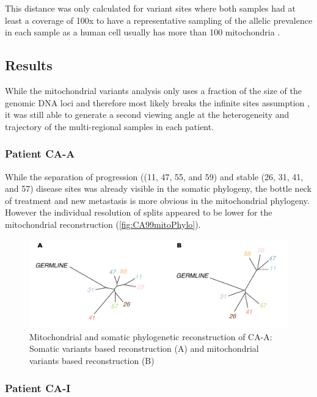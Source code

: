 This distance was only calculated for variant sites where both samples had at least a coverage of 100x to have a representative sampling of the allelic prevalence in each sample as a human cell usually has more than 100 mitochondria \cite{Cole2016}.


\subsection{Results}
\label{cascade-sec:mitoResults}
While the mitochondrial variants analysis only uses a fraction of the size of the genomic DNA loci and therefore most likely breaks the infinite sites assumption \cite{Kimura1969}, it was still able to generate a second viewing angle at the heterogeneity and trajectory of the multi-regional samples in each patient.

\subsubsection{Patient CA-A}

While the separation of progression ((11, 47, 55, and 59) and stable (26, 31, 41, and 57) disease sites was already visible in the somatic phylogeny, the bottle neck of treatment and new metastasis is more obvious in the mitochondrial phylogeny. However the individual resolution of splits appeared to be lower for the mitochondrial reconstruction (\autoref{fig:CA99mitoPhylo}).


\begin{figure}[h]
\centering
\includegraphics[width=.99\linewidth]{Figures/CASCADE/mito/CA99SomVsMitoPhylo.pdf}
\caption[Mitochondrial and somatic phylogenetic reconstruction of CA-A]{Mitochondrial and somatic phylogenetic reconstruction of CA-A: Somatic variants based reconstruction (A) and mitochondrial variants based reconstruction (B)} \label{fig:CA99mitoPhylo}
\end{figure}

\subsubsection{Patient CA-I}

